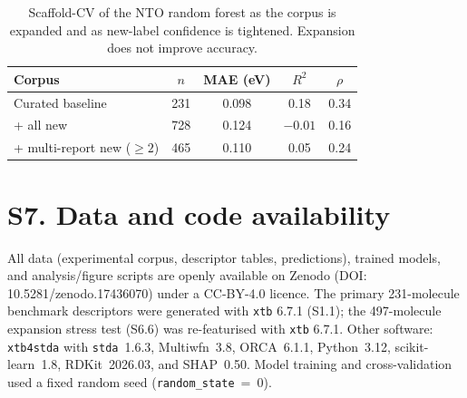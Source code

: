 \documentclass[twoside,twocolumn,9pt]{extarticle}
\begin{document}
\begin{table}[htbp]
  \centering
  \caption{Scaffold-CV of the NTO random forest as the corpus is expanded and as
    new-label confidence is tightened. Expansion does not improve accuracy.}
  \label{tab:expansion}
  \footnotesize
  \begin{tabular}{lcccc}
    \toprule
    Corpus & $n$ & MAE (eV) & $R^2$ & $\rho$ \\
    \midrule
    Curated baseline            & 231 & 0.098 & \phantom{$-$}0.18 & 0.34 \\
    + all new                   & 728 & 0.124 & $-0.01$           & 0.16 \\
    + multi-report new ($\ge 2$) & 465 & 0.110 & \phantom{$-$}0.05 & 0.24 \\
    \bottomrule
  \end{tabular}
\end{table}

\section*{S7. Data and code availability}
All data (experimental corpus, descriptor tables, predictions), trained models,
and analysis/figure scripts are openly available on Zenodo
(DOI: 10.5281/zenodo.17436070) under a CC-BY-4.0 licence. The primary
\num{231}-molecule benchmark descriptors were generated with \texttt{xtb} 6.7.1
(S1.1); the \num{497}-molecule expansion stress test (S6.6) was re-featurised with
\texttt{xtb} 6.7.1. Other software: \texttt{xtb4stda} with \texttt{stda}~1.6.3,
Multiwfn~3.8, ORCA~6.1.1, Python~3.12, scikit-learn~1.8, RDKit~2026.03, and
SHAP~0.50. Model training and cross-validation used a fixed random seed
(\texttt{random\_state}~=~0).

\end{document}

